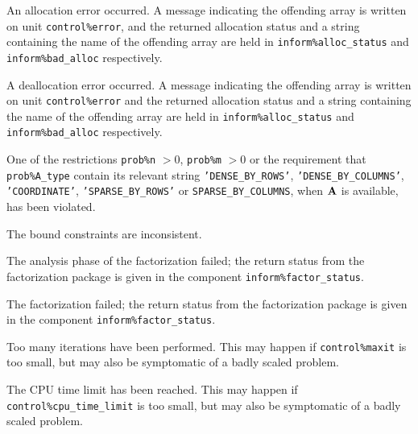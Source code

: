 \documentclass{galahad}
\begin{document}
\begin{description}

 An allocation error occurred. A message indicating
the offending
array is written on unit {\tt control\%error}, and the returned allocation
status and a string containing the name of the offending array
are held in {\tt inform\%alloc\_\-status}
and {\tt inform\%bad\_alloc} respectively.

 A deallocation error occurred.
A message indicating the offending
array is written on unit {\tt control\%error} and the returned allocation
status and a string containing the name of the offending array
are held in {\tt inform\%alloc\_\-status}
and {\tt inform\%bad\_alloc} respectively.

 One of the restrictions
 {\tt prob\%n} $> 0$,
 {\tt prob\%m} $> 0$
    or the requirement that
    {\tt prob\%A\_type} contain its relevant string
    {\tt 'DENSE\_BY\_ROWS'},
    {\tt 'DENSE\_BY\_COLUMNS'}, {\tt 'COORDINATE'}, {\tt 'SPARSE\_BY\_ROWS'}
    or {\tt SPARSE\_BY\_COLUMNS},
    when ${\mathbf{A}}$ is available,  has been violated.


 The bound constraints are inconsistent.


 The analysis phase of the factorization failed;
  the return status from the factorization
    package is given in the component {\tt inform\%fac\-t\-or\_status}.

 The factorization failed; the return status
  from the factorization
    package is given in the component {\tt inform\%fac\-t\-or\_status}.



 Too many iterations have been performed.
   This may happen if
    {\tt control\%maxit} is too small, but may also be symptomatic of
    a badly scaled problem.

 The CPU time limit has been reached. This may happen if
    {\tt control\%cpu\_time\_limit} is too small, but may also be symptomatic
    of a badly scaled problem.


\end{description}
\end{document}
